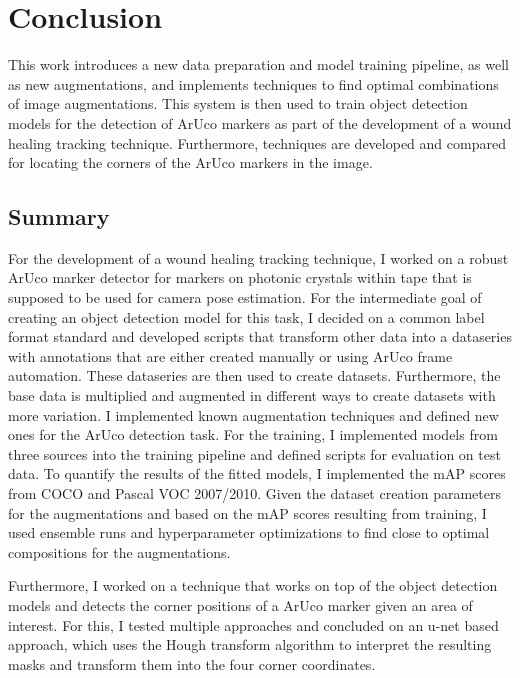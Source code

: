 \documentclass[10pt]{book}
\begin{document}

\chapter{Conclusion}
\label{chap:conclusion}

This work introduces a new data preparation and model training pipeline, as well as new augmentations, and implements techniques to find optimal combinations of image augmentations. This system is then used to train object detection models for the detection of \ac{ArUco} markers as part of the development of a wound healing tracking technique. Furthermore, techniques are developed and compared for locating the corners of the \ac{ArUco} markers in the image.

\section{Summary}

For the development of a wound healing tracking technique, I worked on a robust \ac{ArUco} marker detector for markers on photonic crystals within tape that is supposed to be used for camera pose estimation. For the intermediate goal of creating an object detection model for this task, I decided on a common label format standard and developed scripts that transform other data into a dataseries with annotations that are either created manually or using \ac{ArUco} frame automation. These dataseries are then used to create datasets. Furthermore, the base data is multiplied and augmented in different ways to create datasets with more variation. I implemented known augmentation techniques and defined new ones for the \ac{ArUco} detection task. For the training, I implemented models from three sources into the training pipeline and defined scripts for evaluation on test data. To quantify the results of the fitted models, I implemented the \ac{mAP} scores from \ac{COCO} and Pascal VOC 2007/2010. Given the dataset creation parameters for the augmentations and based on the \ac{mAP} scores resulting from training, I used ensemble runs and hyperparameter optimizations to find close to optimal compositions for the augmentations. 

Furthermore, I worked on a technique that works on top of the object detection models and detects the corner positions of a \ac{ArUco} marker given an area of interest. For this, I tested multiple approaches and concluded on an u-net based approach, which uses the Hough transform algorithm to interpret the resulting masks and transform them into the four corner coordinates.
\end{document}
